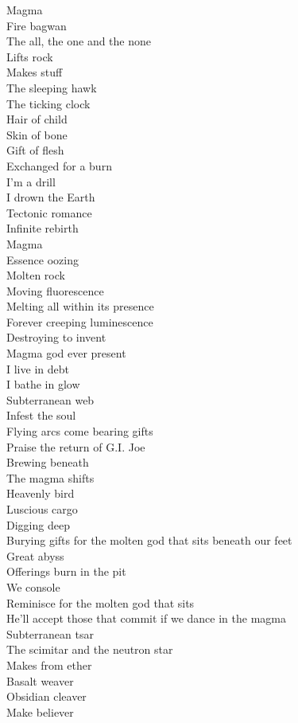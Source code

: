 Magma \\
Fire bagwan \\
The all, the one and the none \\
Lifts rock \\
Makes stuff \\
The sleeping hawk \\
The ticking clock \\
Hair of child \\
Skin of bone \\
Gift of flesh \\
Exchanged for a burn \\
I'm a drill \\
I drown the Earth \\
Tectonic romance \\
Infinite rebirth \\
Magma \\
Essence oozing \\
Molten rock \\
Moving fluorescence \\
Melting all within its presence \\
Forever creeping luminescence \\
Destroying to invent \\
Magma god ever present \\
I live in debt \\
I bathe in glow \\
Subterranean web \\
Infest the soul \\
Flying arcs come bearing gifts \\
Praise the return of G.I. Joe \\
Brewing beneath \\
The magma shifts \\
Heavenly bird \\
Luscious cargo \\
Digging deep \\
Burying gifts for the molten god that sits beneath our feet \\
Great abyss \\
Offerings burn in the pit \\
We console \\
Reminisce for the molten god that sits \\
He'll accept those that commit if we dance in the magma \\
Subterranean tsar \\
The scimitar and the neutron star \\
Makes from ether \\
Basalt weaver \\
Obsidian cleaver \\
Make believer \\

